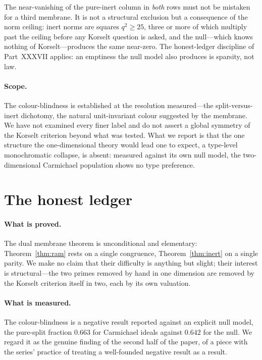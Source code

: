 \documentclass[11pt]{article}
\begin{document}
The near-vanishing of the pure-inert column in \emph{both} rows must not be mistaken for a third
membrane. It is not a structural exclusion but a consequence of the norm ceiling: inert norms are
squares $q^2\ge25$, three or more of which multiply past the ceiling before any Korselt question is
asked, and the null---which knows nothing of Korselt---produces the same near-zero. The honest-ledger
discipline of Part~XXXVII applies: an emptiness the null model also produces is sparsity, not law.

\paragraph{Scope.}
The colour-blindness is established at the resolution measured---the split-versus-inert dichotomy, the
natural unit-invariant colour suggested by the membrane. We have not examined every finer label and do
not assert a global symmetry of the Korselt criterion beyond what was tested. What we report is that
the one structure the one-dimensional theory would lead one to expect, a type-level monochromatic
collapse, is absent: measured against its own null model, the two-dimensional Carmichael population
shows no type preference.

\section{The honest ledger}\label{sec:ledger}
\paragraph{What is proved.} The dual membrane theorem is unconditional and elementary:
Theorem~\ref{thm:ram} rests on a single congruence, Theorem~\ref{thm:inert} on a single parity. We make
no claim that their difficulty is anything but slight; their interest is structural---the two primes
removed by hand in one dimension are removed by the Korselt criterion itself in two, each by its own
valuation.

\paragraph{What is measured.} The colour-blindness is a negative result reported against an explicit
null model, the pure-split fraction $0.663$ for Carmichael ideals against $0.642$ for the null. We
regard it as the genuine finding of the second half of the paper, of a piece with the series' practice
of treating a well-founded negative result as a result.
\end{document}
